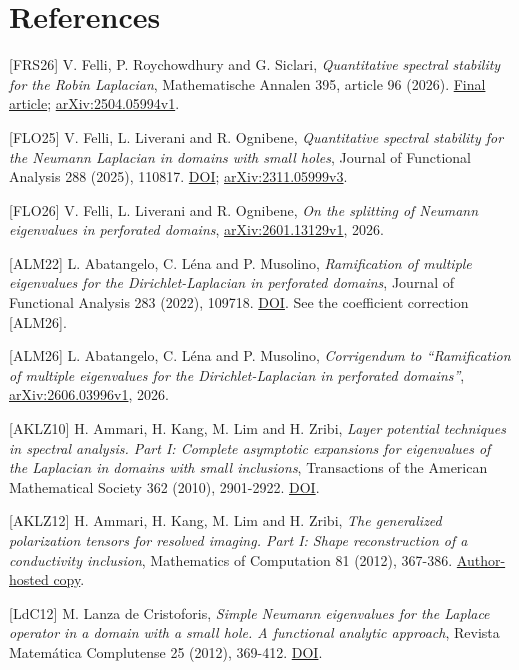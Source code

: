 \documentclass[11pt]{article}
\begin{document}
\raggedright{}\section{References}\label{references}

{[}FRS26{]} V. Felli, P. Roychowdhury and G. Siclari, \emph{Quantitative
spectral stability for the Robin Laplacian}, Mathematische Annalen 395,
article 96 (2026).
\href{https://doi.org/10.1007/s00208-026-03523-4}{Final article};
\href{https://arxiv.org/abs/2504.05994v1}{arXiv:2504.05994v1}.

{[}FLO25{]} V. Felli, L. Liverani and R. Ognibene, \emph{Quantitative
spectral stability for the Neumann Laplacian in domains with small
holes}, Journal of Functional Analysis 288 (2025), 110817.
\href{https://doi.org/10.1016/j.jfa.2024.110817}{DOI};
\href{https://arxiv.org/abs/2311.05999v3}{arXiv:2311.05999v3}.

{[}FLO26{]} V. Felli, L. Liverani and R. Ognibene, \emph{On the
splitting of Neumann eigenvalues in perforated domains},
\href{https://arxiv.org/abs/2601.13129v1}{arXiv:2601.13129v1}, 2026.

{[}ALM22{]} L. Abatangelo, C. Léna and P. Musolino, \emph{Ramification
of multiple eigenvalues for the Dirichlet-Laplacian in perforated
domains}, Journal of Functional Analysis 283 (2022), 109718.
\href{https://doi.org/10.1016/j.jfa.2022.109718}{DOI}. See the
coefficient correction {[}ALM26{]}.

{[}ALM26{]} L. Abatangelo, C. Léna and P. Musolino, \emph{Corrigendum to
``Ramification of multiple eigenvalues for the Dirichlet-Laplacian in
perforated domains''},
\href{https://arxiv.org/abs/2606.03996v1}{arXiv:2606.03996v1}, 2026.

{[}AKLZ10{]} H. Ammari, H. Kang, M. Lim and H. Zribi, \emph{Layer
potential techniques in spectral analysis. Part I: Complete asymptotic
expansions for eigenvalues of the Laplacian in domains with small
inclusions}, Transactions of the American Mathematical Society 362
(2010), 2901-2922.
\href{https://doi.org/10.1090/S0002-9947-10-04695-7}{DOI}.

{[}AKLZ12{]} H. Ammari, H. Kang, M. Lim and H. Zribi, \emph{The
generalized polarization tensors for resolved imaging. Part I: Shape
reconstruction of a conductivity inclusion}, Mathematics of Computation
81 (2012), 367-386.
\href{https://people.math.inha.ac.kr/~hbkang/paper/AKLZ_PT_july20.pdf}{Author-hosted
copy}.

{[}LdC12{]} M. Lanza de Cristoforis, \emph{Simple Neumann eigenvalues
for the Laplace operator in a domain with a small hole. A functional
analytic approach}, Revista Matemática Complutense 25 (2012), 369-412.
\href{https://doi.org/10.1007/s13163-011-0081-8}{DOI}.
\end{document}
